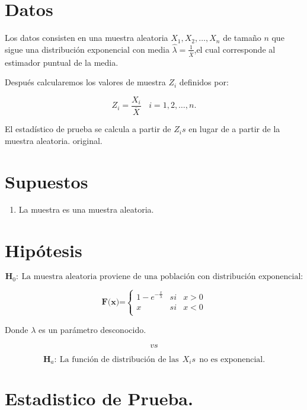 \documentclass[
  a4paper,
  oneside,
  openany]{book}
\providecommand{\tightlist}{%
  \setlength{\itemsep}{0pt}\setlength{\parskip}{0pt}}
\begin{document}
\hypertarget{datos-17}{%
\section{Datos}\label{datos-17}}

Los datos consisten en una muestra aleatoria \(X_{1},X_{2},\ldots,X_{n}\) de tamaño \(n\) que sigue una distribución exponencial con media \(\hat{\lambda} = \frac{1}{\overline{X}}\),el cual corresponde al estimador puntual de la media.

Después calcularemos los valores de muestra \(Z_{i}\) definidos por:

\[Z_{i}=\frac{X_{i}}{\overline{X}} \ \ \ \ i=1,2,\ldots,n.\]

El estadístico de prueba se calcula a partir de \(Z_{i}s\) en lugar de a partir de la muestra aleatoria. original.

\hypertarget{supuestos-15}{%
\section{Supuestos}\label{supuestos-15}}

\begin{enumerate}
\def\labelenumi{\arabic{enumi})}
\tightlist
\item
  La muestra es una muestra aleatoria.
\end{enumerate}

\hypertarget{hipuxf3tesis-16}{%
\section{Hipótesis}\label{hipuxf3tesis-16}}

\[\textbf{H}_0: \ \mbox{La muestra aleatoria proviene de una población con distribución exponencial:}\]

\[
\textbf{F(x)=} \left\{
\begin{array}{lcc}
1-e^{-\frac{x}{\lambda}} & si & x > 0 \\
x & si &  x < 0 \\
\end{array}
\right.
\]

Donde \(\lambda\) es un parámetro desconocido.

\[vs\]

\[\textbf{H}_a: \ \mbox{La función de distribución de las} \ \  X_{i}s \ \  \mbox{no es exponencial.}\]

\hypertarget{estadistico-de-prueba.}{%
\section{Estadistico de Prueba.}\label{estadistico-de-prueba.}}
\end{document}
